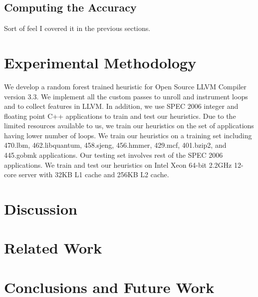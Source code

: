 \documentclass[]{sig-alternate}
\begin{document}
\subsection{Computing the Accuracy}
\label{subsec:ComputingAccuracy}

Sort of feel I covered it in the previous sections. 

\section{Experimental Methodology}\label{sec:experimental_methodology}
We develop a random forest trained heuristic for Open Source LLVM Compiler version 3.3. We implement all the custom passes to unroll and instrument loops and to collect features in LLVM. In addition, we use SPEC 2006 integer and floating point C++ applications to train and test our heuristics. Due to the limited resources available to us, we train our heuristics on the set of applications having lower number of loops. We train our heuristics on a training set including 470.lbm, 462.libquantum, 458.sjeng, 456.hmmer, 429.mcf, 401.bzip2, and 445.gobmk applications. Our testing set involves rest of the SPEC 2006 applications. We train and test our heuristics on Intel Xeon 64-bit 2.2GHz 12-core server with 32KB L1 cache and 256KB L2 cache.


\section{Discussion}
\label{sec:Discussion}


\section{Related Work}
\label{sec:RelatedWork}

\section{Conclusions and Future Work}
\label{sec:FutureWork}

%

\begin{scriptsize}
  
\end{scriptsize}
\end{document}
